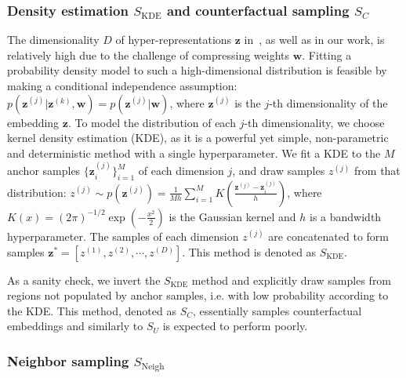 \documentclass{article}
\begin{document}
\subsubsection{Density estimation $S_{\text{KDE}}$ and counterfactual sampling $S_C$}
\vspace{-3pt}
The dimensionality $D$ of hyper-representations $\mathbf{z}$ in~\citep{schurholtSelfSupervisedRepresentationLearning2021}, as well as in our work, is relatively high due to the challenge of compressing weights $\mathbf{w}$. 
Fitting a probability density model to such a high-dimensional distribution is feasible by making a conditional independence assumption: $p(\mathbf{z}^{(j)}|\mathbf{z}^{(k)}, \mathbf{w}) = p(\mathbf{z}^{(j)}| \mathbf{w})$, where $\mathbf{z}^{(j)}$ is the $j$-th dimensionality of the embedding $\mathbf{z}$.
To model the distribution of each $j$-th dimensionality, we choose kernel density estimation (KDE), as it is a powerful yet simple, non-parametric and deterministic method with a single hyperparameter.
%
We fit a KDE to the $M$ anchor samples $\{\mathbf{z}_{i}^{(j)}\}_{i=1}^M$ of each dimension $j$, and draw samples $z^{(j)}$ from that distribution: $ z^{(j)} \sim p(\mathbf{z}^{(j)}) = \frac{1}{M h} \sum\nolimits_{i=1}^{M} K(\frac{\mathbf{z}^{(j)} - \mathbf{z}^{(j)}_i}{h})
$,
\noindent where $K(x)=(2\pi)^{-1/2} \exp{(-\frac{x^2}{2})}  $
is the Gaussian kernel and $h$ is a bandwidth hyperparameter.
The samples of each dimension $z^{(j)}$ are concatenated to form samples $\mathbf{z}^* = [z^{(1)}, z^{(2)}, \cdots, z^{(D)}]$. This method is denoted as $S_{\text{KDE}}$.

As a sanity check, we invert the $S_{\text{KDE}}$ method and explicitly draw samples from regions not populated by anchor samples, i.e. with low probability according to the KDE. This method, denoted as $S_C$, essentially samples counterfactual embeddings and similarly to $S_U$ is expected to perform poorly.
%
\vspace{-3pt}
\subsubsection{Neighbor sampling $S_{\text{Neigh}}$}
\vspace{-3pt}
\end{document}
